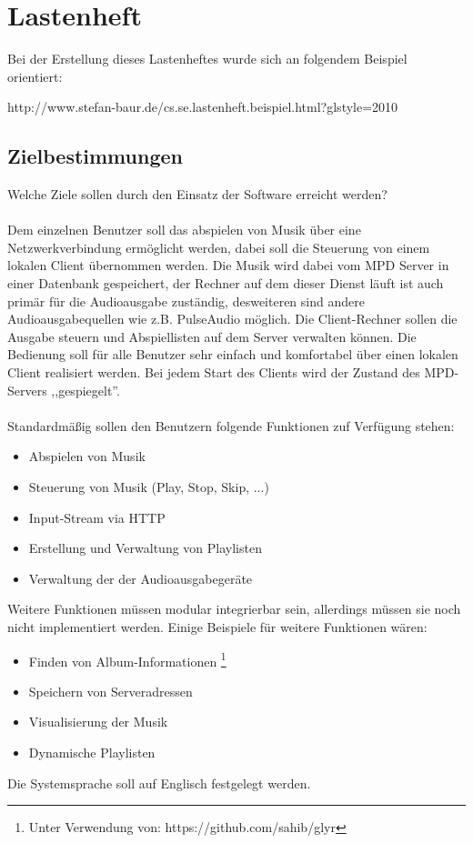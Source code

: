 \chapter{Lastenheft}
Bei der Erstellung dieses Lastenheftes wurde sich an folgendem Beispiel orientiert:
\begin{center}
http://www.stefan-baur.de/cs.se.lastenheft.beispiel.html?glstyle=2010
\end{center}
\section{Zielbestimmungen}
Welche Ziele sollen durch den Einsatz der Software erreicht werden?\ \\ \\
Dem einzelnen Benutzer soll das abspielen von Musik über eine Netzwerkverbindung ermöglicht
werden, dabei soll die Steuerung von einem lokalen Client übernommen werden. 
Die Musik wird dabei vom MPD Server in einer Datenbank gespeichert, der Rechner auf dem dieser
Dienst läuft ist auch primär für die Audioausgabe zuständig, desweiteren sind andere Audioausgabequellen
wie z.B. PulseAudio möglich.
Die Client-Rechner sollen die Ausgabe steuern und Abspiellisten auf dem Server verwalten
können. Die Bedienung soll für alle Benutzer sehr einfach und komfortabel über einen lokalen
Client realisiert werden. Bei jedem Start des Clients wird der Zustand des MPD-Servers ,,gespiegelt''.
\\ \\
Standardmäßig sollen den Benutzern folgende Funktionen zuf Verfügung stehen:
\renewcommand{\labelitemi}{•}
\begin{itemize}
        \item Abspielen von Musik
        \item Steuerung von Musik (Play, Stop, Skip, ...)
        \item Input-Stream via HTTP
        \item Erstellung und Verwaltung von Playlisten
        \item Verwaltung der der Audioausgabegeräte
\end{itemize}
Weitere Funktionen müssen modular integrierbar sein, allerdings müssen sie noch nicht implementiert
werden. Einige Beispiele für weitere Funktionen wären:
\begin{itemize}
	\item Finden von Album-Informationen \footnote{Unter Verwendung von: https://github.com/sahib/glyr}
	\item Speichern von Serveradressen
	\item Visualisierung der Musik
	\item Dynamische Playlisten
\end{itemize}
Die Systemsprache soll auf Englisch festgelegt werden.
